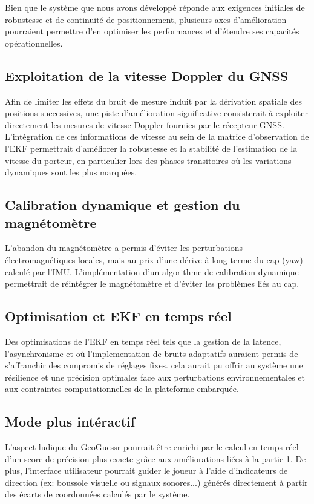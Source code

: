 Bien que le système que nous avons développé réponde aux exigences initiales de robustesse et de continuité de positionnement, plusieurs axes d'amélioration pourraient permettre d'en optimiser les performances et d'étendre ses capacités opérationnelles.

\subsection{Exploitation de la vitesse Doppler du GNSS}

Afin de limiter les effets du bruit de mesure induit par la dérivation spatiale des positions successives, une piste d'amélioration significative consisterait à exploiter directement les mesures de vitesse Doppler fournies par le récepteur GNSS. L'intégration de ces informations de vitesse au sein de la matrice d'observation de l'EKF permettrait d'améliorer la robustesse et la stabilité de l'estimation de la vitesse du porteur, en particulier lors des phases transitoires où les variations dynamiques sont les plus marquées.

\subsection{Calibration dynamique et gestion du magnétomètre}

L'abandon du magnétomètre a permis d'éviter les perturbations électromagnétiques locales, mais au prix d'une dérive à long terme du cap (yaw) calculé par l'IMU. L'implémentation d'un algorithme de calibration dynamique permettrait de réintégrer le magnétomètre et d'éviter les problèmes liés au cap.

\subsection{Optimisation et EKF en temps réel}

Des optimisations de l'EKF en temps réel tels que la gestion de la latence, l'asynchronisme et où l'implementation de bruits adaptatifs auraient permis de s'affranchir des compromis de réglages fixes. cela aurait pu offrir au système une résilience et une précision optimales face aux perturbations environnementales et aux contraintes computationnelles de la plateforme embarquée.

\subsection{Mode plus intéractif}

L'aspect ludique du GeoGuessr pourrait être enrichi par le calcul en temps réel d'un score de précision plus exacte grâce aux améliorations liées à la partie 1. De plus, l'interface utilisateur pourrait guider le joueur à l'aide d'indicateurs de direction (ex: boussole visuelle ou signaux sonores...) générés directement à partir des écarts de coordonnées calculés par le système.